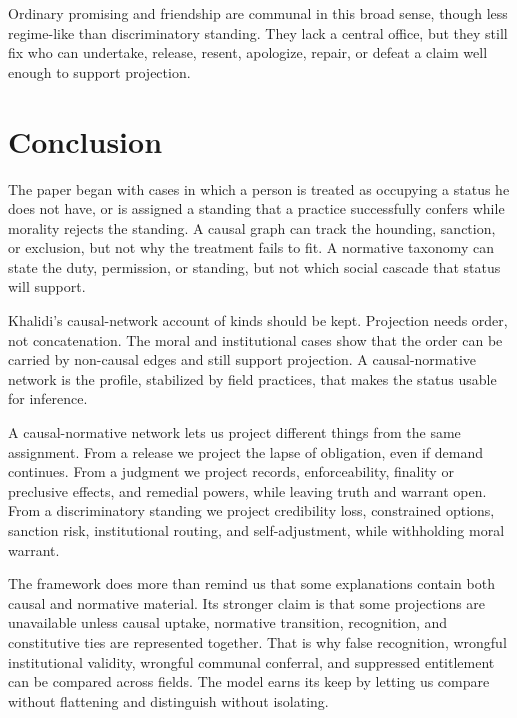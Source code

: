 \documentclass[12pt]{article}
\begin{document}
Ordinary promising and friendship are communal in this broad sense, though less regime-like than discriminatory standing. They lack a central office, but they still fix who can undertake, release, resent, apologize, repair, or defeat a claim well enough to support projection.

\section{Conclusion}
\label{sec:conclusion}

The paper began with cases in which a person is treated as occupying a status he does not have, or is assigned a standing that a practice successfully confers while morality rejects the standing. A causal graph can track the hounding, sanction, or exclusion, but not why the treatment fails to fit. A normative taxonomy can state the duty, permission, or standing, but not which social cascade that status will support.

Khalidi's causal-network account of kinds should be kept. Projection needs order, not concatenation. The moral and institutional cases show that the order can be carried by non-causal edges and still support projection. A causal-normative network is the profile, stabilized by field practices, that makes the status usable for inference.

A causal-normative network lets us project different things from the same assignment. From a release we project the lapse of obligation, even if demand continues. From a judgment we project records, enforceability, finality or preclusive effects, and remedial powers, while leaving truth and warrant open. From a discriminatory standing we project credibility loss, constrained options, sanction risk, institutional routing, and self-adjustment, while withholding moral warrant.

The framework does more than remind us that some explanations contain both causal and normative material. Its stronger claim is that some projections are unavailable unless causal uptake, normative transition, recognition, and constitutive ties are represented together. That is why false recognition, wrongful institutional validity, wrongful communal conferral, and suppressed entitlement can be compared across fields. The model earns its keep by letting us compare without flattening and distinguish without isolating.


\newpage
\printbibliography
\end{document}
